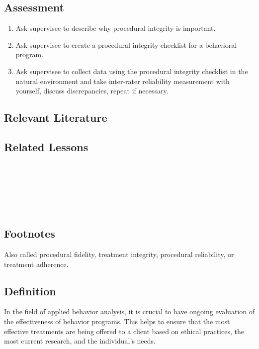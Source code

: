 \subsection{Assessment}
\begin{enumerate}
\item Ask supervisee to describe why procedural integrity is important.
\item Ask supervisee to create a procedural integrity checklist for a behavioral program.
\item Ask supervisee to collect data using the procedural integrity checklist in the natural environment and take inter-rater reliability measurement with yourself, discuss discrepancies, repeat if necessary.
\end{enumerate}
%
\subsection{Relevant Literature}
\begin{refsection}
\nocite{cooper2007applied,
        johnston2010strategies,
        wolery1994procedural}
\printbibliography[heading=none]
\end{refsection} 
%                         
\subsection{Related Lessons}
\fourfOne{}\\
\fourhThree{}\\
\fourhFour{}\\
\fourkThree{}\\
\fourkFour{}\\
%
\subsection{Footnotes}
Also called procedural fidelity, treatment integrity, procedural reliability, or treatment adherence.
%
\subsection{Definition}
In the field of applied behavior analysis, it is crucial to have ongoing evaluation of the effectiveness of behavior programs.  This helps to ensure that the most effective treatments are being offered to a client based on ethical practices, the most current research, and the individual's needs.  

